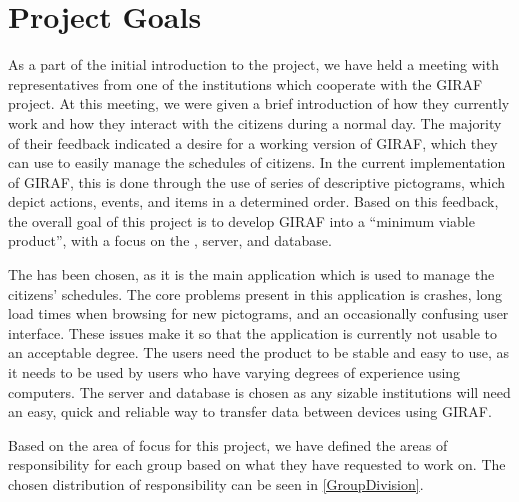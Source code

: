\section{Project Goals}\label{projectGoals}
As a part of the initial introduction to the project, we have held a meeting with
representatives from one of the institutions which cooperate with the GIRAF
project. At this meeting, we were given a brief introduction of how they
currently work and how they interact with the citizens during a normal day. The
majority of their feedback indicated a desire for a working version of GIRAF,
which they can use to easily manage the schedules of citizens. In the
current implementation of GIRAF, this is done through the use of series of
descriptive pictograms, which depict actions, events, and items in a determined
order. Based on this feedback, the overall goal of this project is to develop
GIRAF into a ``minimum viable product'', with a focus on the
, server, and database.\nl

The  has been chosen, as it is the main application which is used
to manage the citizens' schedules. The core problems present in this application
is crashes, long load times when browsing for new pictograms, and an occasionally
confusing user interface. These issues make it so that the application is
currently not usable to an acceptable degree. The users need the product to be
stable and easy to use, as it needs to be used by users who have varying degrees
of experience using computers. The server and database is chosen as any sizable
institutions will need an easy, quick and reliable way to transfer data between
devices using GIRAF.\nl

Based on the area of focus for this project, we have defined the areas of
responsibility for each group based on what they have requested to work on. The
chosen distribution of responsibility can be seen in \autoref{GroupDivision}.

